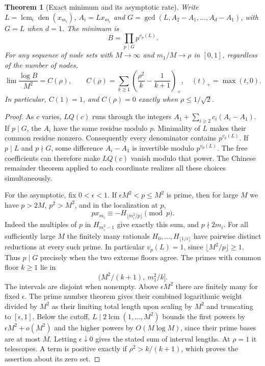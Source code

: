 \documentclass[11pt,a4paper,oneside,openany]{report}
\newtheorem{theorem}{Theorem}[section]
\theoremstyle{remark}\newtheorem{remark}[theorem]{Remark}
\numberwithin{equation}{section}
\begin{document}
\begin{theorem}[Exact minimum and its asymptotic rate]\label{ch5:wl:min}
Write $L=\operatorname{lcm}_i\operatorname{den}(x_{m_i})$,
$A_i=Lx_{m_i}$ and
$G=\gcd(L,A_2-A_1,\ldots,A_d-A_1)$, with $G=L$ when $d=1$.
The minimum is
\[
            B=\prod_{p\mid G}p^{v_p(L)} .
\]
For any sequence of node sets with $M\to\infty$ and $m_1/M\to\rho$
in $[0,1]$, regardless of the number of nodes,
\[
 \lim\frac{\log B}{M^2}=C(\rho),\qquad
 C(\rho)=\sum_{k\ge1}\left(\frac{\rho^2}{k}-\frac1{k+1}\right)_+,
 \quad (t)_+=\max(t,0).
\]
In particular, $C(1)=1$, and $C(\rho)=0$ exactly when
$\rho\le 1/\sqrt2$.
\end{theorem}

\begin{proof}
As $c$ varies, $LQ(c)$ runs through the integers
$A_1+\sum_{i\ge2} c_i(A_i-A_1)$. If $p\mid G$, the $A_i$ have the
same residue modulo $p$. Minimality of $L$ makes their common residue
nonzero. Consequently every denominator contains $p^{v_p(L)}$.
If $p\mid L$ and $p\nmid G$, some difference $A_i-A_1$ is invertible
modulo $p^{v_p(L)}$. The free coefficients can therefore make
$LQ(c)$ vanish modulo that power. The Chinese remainder theorem applied
to each coordinate realizes all these choices simultaneously.

For the asymptotic, fix $0<\epsilon<1$. If
$\epsilon M^2<p\le M^2$ is prime, then for large $M$ we have $p>2M$,
$p^2>M^2$, and in the localization at $p$,
\begin{equation}\label{ch5:wl:res}
 p x_{m_i}\equiv-H_{\lfloor m_i^2/p\rfloor}\pmod p .
\end{equation}
Indeed the multiples of $p$ in $H_{m_i^2-1}$ give exactly this sum,
and $p\nmid 2m_i$. For all sufficiently large $M$ the finitely many
rationals $H_0,\ldots,H_{\lfloor1/\epsilon\rfloor}$ have pairwise
distinct reductions at every such prime. In particular $v_p(L)=1$,
since $\lfloor M^2/p\rfloor\ge1$. Thus $p\mid G$ precisely when the
two extreme floors agree. The primes with common floor $k\ge1$ lie in
\[
                  (M^2/(k+1),\ m_1^2/k] .
\]
The intervals are disjoint when nonempty. Above $\epsilon M^2$ there
are finitely many for fixed $\epsilon$. The prime number theorem gives
their combined logarithmic weight divided by $M^2$ as their limiting
total length upon scaling by $M^2$ and truncating to $[\epsilon,1]$.
Below the cutoff, $L\mid 2\operatorname{lcm}(1,\ldots,M^2)$ bounds
the first powers by $\epsilon M^2+o(M^2)$ and the higher powers by
$O(M\log M)$, since their prime bases are at most $M$.
Letting $\epsilon\downarrow0$ gives the stated sum of interval lengths.
At $\rho=1$ it telescopes. A term is positive exactly if
$\rho^2>k/(k+1)$, which proves the assertion about its zero set.
\end{proof}
\end{document}

